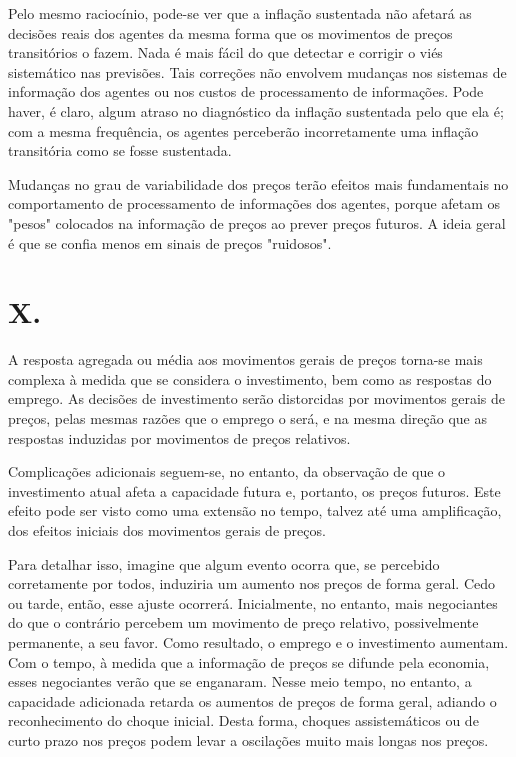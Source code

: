 \documentclass[12pt]{article}
\begin{document}
Pelo mesmo raciocínio, pode-se ver que a inflação sustentada não afetará as decisões reais dos agentes da mesma forma que os movimentos de preços transitórios o fazem. Nada é mais fácil do que detectar e corrigir o viés sistemático nas previsões. Tais correções não envolvem mudanças nos sistemas de informação dos agentes ou nos custos de processamento de informações. Pode haver, é claro, algum atraso no diagnóstico da inflação sustentada pelo que ela é; com a mesma frequência, os agentes perceberão incorretamente uma inflação transitória como se fosse sustentada.

Mudanças no grau de variabilidade dos preços terão efeitos mais fundamentais no comportamento de processamento de informações dos agentes, porque afetam os "pesos" colocados na informação de preços ao prever preços futuros. A ideia geral é que se confia menos em sinais de preços "ruidosos".

\section*{X.}

A resposta agregada ou média aos movimentos gerais de preços torna-se mais complexa à medida que se considera o investimento, bem como as respostas do emprego. As decisões de investimento serão distorcidas por movimentos gerais de preços, pelas mesmas razões que o emprego o será, e na mesma direção que as respostas induzidas por movimentos de preços relativos.

Complicações adicionais seguem-se, no entanto, da observação de que o investimento atual afeta a capacidade futura e, portanto, os preços futuros. Este efeito pode ser visto como uma extensão no tempo, talvez até uma amplificação, dos efeitos iniciais dos movimentos gerais de preços.

Para detalhar isso, imagine que algum evento ocorra que, se percebido corretamente por todos, induziria um aumento nos preços de forma geral. Cedo ou tarde, então, esse ajuste ocorrerá. Inicialmente, no entanto, mais negociantes do que o contrário percebem um movimento de preço relativo, possivelmente permanente, a seu favor. Como resultado, o emprego e o investimento aumentam. Com o tempo, à medida que a informação de preços se difunde pela economia, esses negociantes verão que se enganaram. Nesse meio tempo, no entanto, a capacidade adicionada retarda os aumentos de preços de forma geral, adiando o reconhecimento do choque inicial. Desta forma, choques assistemáticos ou de curto prazo nos preços podem levar a oscilações muito mais longas nos preços.
\end{document}
